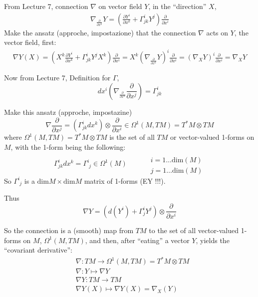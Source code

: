 	From Lecture 7, connection $\nabla$ on vector field $Y$, in the ``direction'' $X$,
	\[
	\begin{gathered}
	\nabla_{ \frac{ \partial }{ \partial x^k } } Y = \left( \frac{ \partial Y^i }{ \partial x^k } + \Gamma^i_{jk} Y^j  \right) \frac{ \partial }{ \partial x^i }
	\end{gathered}
	\]
	Make the ansatz (approche, impostazione) that the connection $\nabla$ acts on $Y$, the vector field, first:
	\[
	\begin{gathered}
	\nabla Y(X) = \left( X^k \frac{ \partial Y^i}{ \partial x^k} + \Gamma^i_{jk} Y^j X^k \right) \frac{ \partial}{ \partial x^i } = X^k \left( \nabla_{ \frac{ \partial }{ \partial x^k} } Y \right)^i \frac{ \partial }{ \partial x^i} = (\nabla_X Y)^i \frac{ \partial}{ \partial x^i} = \nabla_XY
	\end{gathered}
	\]
	
	Now from Lecture 7, Definition for $\Gamma$, 
	\[
	dx^i \left( \nabla_{ \frac{  \partial }{ \partial x^k } } \frac{ \partial }{ \partial x^j } \right) = \Gamma^i_{jk}
	\]
	
	Make this ansatz (approche, impostazine)
	\[
	\nabla \frac{ \partial}{ \partial x^j } = \left( \Gamma^i_{jk} dx^k \right) \otimes \frac{ \partial }{ \partial x^i} \in \Omega^1(M,TM) = T^*M \otimes TM
	\]
	where $\Omega^1(M,TM) = T^*M \otimes TM$ is the set of all $TM$ or vector-valued 1-forms on $M$, with the 1-form being the following:
	\[
	\Gamma^i_{jk} dx^k = \Gamma^i_{ \, \, j } \in \Omega^1(M) \quad \quad \, \begin{aligned}
	& \quad \\
	& i = 1 \dots \text{dim}(M) \\ 
	& j = 1\dots \text{dim}(M) \end{aligned}
	\]
	So $\Gamma^i_{ \, \, j}$ is a $\text{dim}M \times \text{dim}M$ matrix of 1-forms (EY !!!). 
	
	Thus
	\[
	\nabla Y = (d(Y^i) + \Gamma^i_j Y^j ) \otimes \frac{ \partial }{ \partial x^i}
	\]
	
	So the connection is a (smooth) map from $TM$ to the set of all vector-valued 1-forms on $M$, $\Omega^1(M,TM)$, and then, after ``eating'' a vector $Y$, yields the ``covariant derivative'':
	\[
	\begin{aligned}
	& \nabla: TM \to \Omega^1(M,TM) = T^*M \otimes TM \\ 
	& \nabla : Y \mapsto \nabla Y \\ 
	& \nabla Y : TM \to TM \\
	& \nabla Y(X) \mapsto \nabla Y(X) = \nabla_X(Y)
	\end{aligned}
	\]
	

